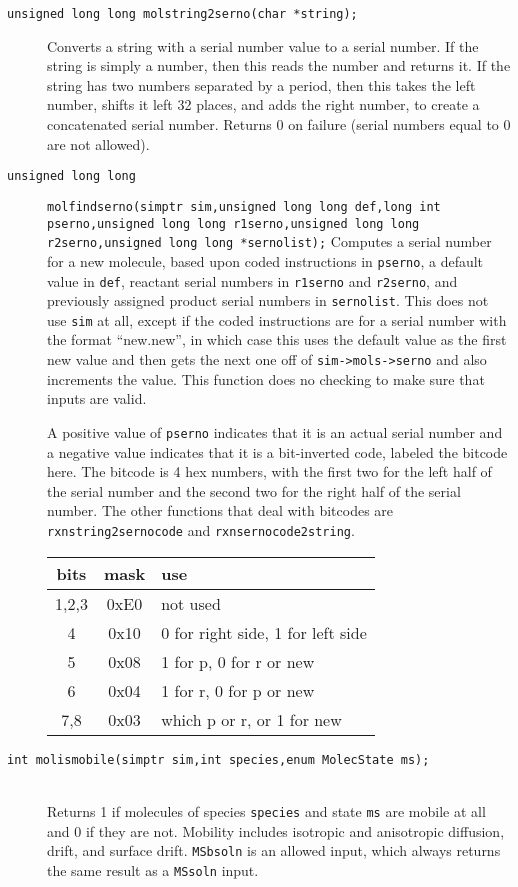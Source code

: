 \documentclass {book}
\begin{document}
\begin{description}
\item[\texttt{unsigned long long molstring2serno(char *string);}]
\hfill
Converts a string with a serial number value to a serial number. If the string is simply a number, then this reads the number and returns it. If the string has two numbers separated by a period, then this takes the left number, shifts it left 32 places, and adds the right number, to create a concatenated serial number. Returns 0 on failure (serial numbers equal to 0 are not allowed).

\item[\texttt{unsigned long long}]
\texttt{molfindserno(simptr sim,unsigned long long def,long int pserno,unsigned long long r1serno,unsigned long long r2serno,unsigned long long *sernolist);}
\hfill
Computes a serial number for a new molecule, based upon coded instructions in \texttt{pserno}, a default value in \texttt{def}, reactant serial numbers in \texttt{r1serno} and \texttt{r2serno}, and previously assigned product serial numbers in \texttt{sernolist}. This does not use \texttt{sim} at all, except if the coded instructions are for a serial number with the format ``new.new'', in which case this uses the default value as the first new value and then gets the next one off of \texttt{sim->mols->serno} and also increments the value. This function does no checking to make sure that inputs are valid.

A positive value of \texttt{pserno} indicates that it is an actual serial number and a negative value indicates that it is a bit-inverted code, labeled the bitcode here. The bitcode is 4 hex numbers, with the first two for the left half of the serial number and the second two for the right half of the serial number. The other functions that deal with bitcodes are \texttt{rxnstring2sernocode} and \texttt{rxnsernocode2string}.

\begin{longtable}[c]{ccl}
bits & mask & use\\
\hline
1,2,3 & 0xE0 & not used\\
4 & 0x10 & 0 for right side, 1 for left side\\
5 & 0x08 & 1 for p, 0 for r or new\\
6 & 0x04 & 1 for r, 0 for p or new\\
7,8 & 0x03 & which p or r, or 1 for new
\end{longtable}

\item[\texttt{int molismobile(simptr sim,int species,enum MolecState ms);}]
\hfill \\
Returns 1 if molecules of species \texttt{species} and state \texttt{ms} are mobile at all and 0 if they are not.  Mobility includes isotropic and anisotropic diffusion, drift, and surface drift. \texttt{MSbsoln} is an allowed input, which always returns the same result as a \texttt{MSsoln} input.


\end{description}
\end{document}
